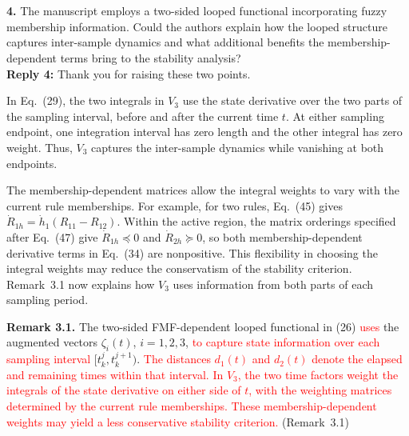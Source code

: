 \documentclass[10pt,fleqn]{article}
\begin{document}
~\\
\\
\textbf{4.} The manuscript employs a two-sided looped functional incorporating fuzzy membership information. Could the authors explain how the looped structure captures inter-sample dynamics and what additional benefits the membership-dependent terms bring to the stability analysis?
\\[10pt]
\indent \textbf{Reply 4:} Thank you for raising these two points.\par
{\setlength{\parskip}{5pt}\indent In Eq.~(29), the two integrals in $V_3$ use the state derivative over the two parts of the sampling interval, before and after the current time $t$. At either sampling endpoint, one integration interval has zero length and the other integral has zero weight. Thus, $V_3$ captures the inter-sample dynamics while vanishing at both endpoints.\par
\indent The membership-dependent matrices allow the integral weights to vary with the current rule memberships. For example, for two rules, Eq.~(45) gives $\dot R_{1h}=\dot h_1(R_{11}-R_{12})$. Within the active region, the matrix orderings specified after Eq.~(47) give $\dot R_{1h}\preceq 0$ and $\dot R_{2h}\succeq 0$, so both membership-dependent derivative terms in Eq.~(34) are nonpositive. This flexibility in choosing the integral weights may reduce the conservatism of the stability criterion. Remark~3.1 now explains how $V_3$ uses information from both parts of each sampling period.\par
\noindent \textbf{Remark 3.1.} The two-sided FMF-dependent looped functional in (26) \textcolor{red}{uses} the augmented vectors $\zeta_i(t)$, $i=1,2,3$, \textcolor{red}{to capture state information over each sampling interval} $[t_k^j,t_k^{j+1})$. \textcolor{red}{The distances $d_1(t)$ and $d_2(t)$ denote the elapsed and remaining times within that interval.} \textcolor{red}{In $V_3$, the two time factors weight the integrals of the state derivative on either side of $t$, with the weighting matrices determined by the current rule memberships.} \textcolor{red}{These membership-dependent weights may yield a less conservative stability criterion.} \mbox{(Remark~3.1)}\par}
\end{document}
